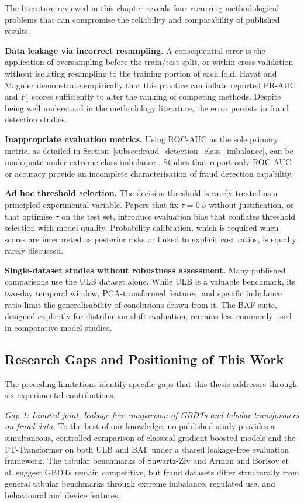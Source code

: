The literature reviewed in this chapter reveals four recurring methodological problems that can compromise the reliability and comparability of published results.

\textbf{Data leakage via incorrect resampling.} A consequential error is the application of oversampling before the train/test split, or within cross-validation without isolating resampling to the training portion of each fold. Hayat and Magnier \cite{hayat2025leakage} demonstrate empirically that this practice can inflate reported PR-AUC and $F_1$ scores sufficiently to alter the ranking of competing methods. Despite being well understood in the methodology literature, the error persists in fraud detection studies.

\textbf{Inappropriate evaluation metrics.} Using ROC-AUC as the sole primary metric, as detailed in Section~\ref{subsec:fraud_detection_class_imbalance}, can be inadequate under extreme class imbalance \cite{saito2015precision, imani2026why}. Studies that report only ROC-AUC or accuracy provide an incomplete characterisation of fraud detection capability.

\textbf{Ad hoc threshold selection.} The decision threshold is rarely treated as a principled experimental variable. Papers that fix $\tau = 0.5$ without justification, or that optimise $\tau$ on the test set, introduce evaluation bias that conflates threshold selection with model quality. Probability calibration, which is required when scores are interpreted as posterior risks or linked to explicit cost ratios, is equally rarely discussed.

\textbf{Single-dataset studies without robustness assessment.} Many published comparisons use the ULB dataset alone. While ULB is a valuable benchmark, its two-day temporal window, PCA-transformed features, and specific imbalance ratio limit the generalisability of conclusions drawn from it. The BAF suite, designed explicitly for distribution-shift evaluation, remains less commonly used in comparative model studies.

\subsection{Research Gaps and Positioning of This Work}
\label{subsec:sota-gaps}

The preceding limitations identify specific gaps that this thesis addresses through six experimental contributions.

\textit{Gap 1: Limited joint, leakage-free comparison of GBDTs and tabular transformers on fraud data.} To the best of our knowledge, no published study provides a simultaneous, controlled comparison of classical gradient-boosted models and the FT-Transformer on both ULB and BAF under a shared leakage-free evaluation framework. The tabular benchmarks of Shwartz-Ziv and Armon \cite{shwartzziv2022tabular} and Borisov et al. \cite{borisov2022deep} suggest GBDTs remain competitive, but fraud datasets differ structurally from general tabular benchmarks through extreme imbalance, regulated use, and behavioural and device features.

